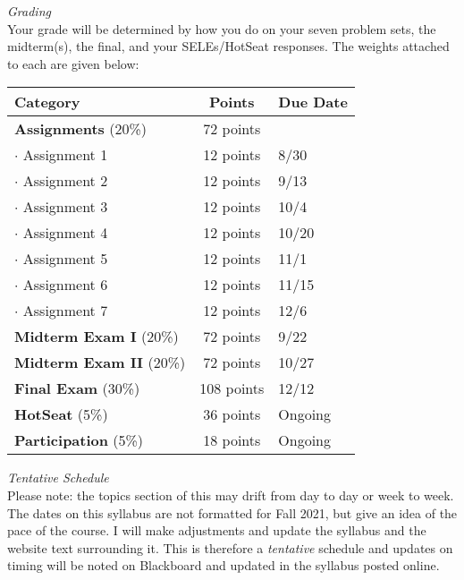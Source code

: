 \documentclass[a4paper]{article}
\begin{document}
\emph{Grading}\\
Your grade will be determined by how you do on your seven problem sets, the midterm(s), the final, and your SELEs/HotSeat responses.  The weights attached to each are given below:\\
\begin{table}[ht!]
\centering
\begin{tabular}{lcl}
Category & Points & Due Date \\
\hline
\textbf{Assignments} (20\%) & 72 points & \\
$\cdot$ Assignment 1 & 12 points & 8/30\\
$\cdot$ Assignment 2 & 12 points & 9/13\\
$\cdot$ Assignment 3 & 12 points & 10/4\\
$\cdot$ Assignment 4 & 12 points & 10/20\\
$\cdot$ Assignment 5 & 12 points & 11/1\\
$\cdot$ Assignment 6 & 12 points & 11/15\\
$\cdot$ Assignment 7 & 12 points & 12/6\\
\hline
\textbf{Midterm Exam I } (20\%) & 72 points & 9/22\\
\hline
\textbf{Midterm Exam II} (20\%) & 72 points & 10/27\\
\hline
\textbf{Final Exam} (30\%) & 108 points & 12/12\\
\hline
\textbf{HotSeat} (5\%) & 36 points & Ongoing\\
\hline
\textbf{Participation} (5\%) & 18 points & Ongoing\\
\end{tabular}
\end{table}


\clearpage
\emph{Tentative Schedule}\\
Please note: the topics section of this may drift from day to day or week to week.  The dates on this syllabus are not formatted for Fall 2021, but give an idea of the pace of the course.  I will make adjustments and update the syllabus and the website text surrounding it.  This is therefore a \emph{tentative} schedule and updates on timing will be noted on Blackboard and updated in the syllabus posted online.\\
\end{document}
